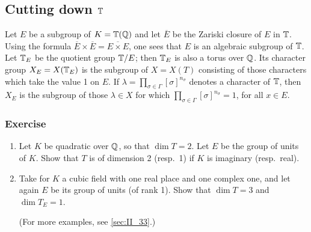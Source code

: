 \subsection{Cutting down $\mathbb{T}$}
\label{sec:II_12}
Let $E$ be a subgroup of $K = \mathbb{T}(\mathbb{Q})$ and let $\overline{E}$ be the Zariski
closure of $E$ in $\mathbb{T}$. Using the formula $\overline{E} \times \overline{E} =
\overline{E \times E}$, one sees that $E$ is an algebraic subgroup of $\mathbb{T}$.
Let $\mathbb{T}_E$ be the quotient group $\mathbb{T}/E$; then $\mathbb{T}_E$ is also a torus over
$\mathbb{Q}$. Its character group $X_E = X(\mathbb{T}_E)$ is the subgroup of $X = X(T)$
consisting of those characters which take the value 1 on $E$.
If $\lambda = \prod_{\sigma \in \Gamma} [\sigma]^{n_\sigma}$ denotes a
character of $\mathbb{T}$, then $X_E$ is the subgroup of those $\lambda \in X$ for 
which
$\prod_{\sigma \in \Gamma} [\sigma]^{n_\sigma} = 1$, for all $x \in E$.

\subsubsection*{Exercise}
\begin{enumerate}[label=\textit{\alph*}.]
\item Let $K$ be quadratic over $\mathbb{Q}$, so that $\dim T = 2$. Let $E$ be the
	group of units of $K$. Show that $T$ is of dimension 2 (resp.\ 1) if
	$K$ is imaginary (resp.\ real).
\item Take for $K$ a cubic field with one real place and one complex one, and
	let again $E$ be its group of units (of rank 1). Show that $\dim T = 3$
	and $\dim T_E = 1$.

	(For more examples, see \ref{sec:II_33}.)\dpage
\end{enumerate}

